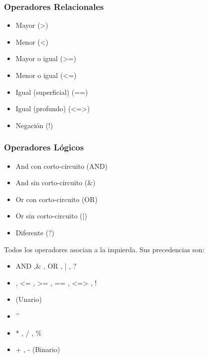 \documentclass[12pt, spanish]{report}
\begin{document}
\subsubsection{Operadores Relacionales}
\begin{itemize}
\item Mayor         (>)
\item Menor         (<)
\item Mayor o igual (>=)
\item Menor o igual (<=)
\item Igual (superficial) (==)
\item Igual (profundo)    (<=>)
\item Negaci\'on      (!)
\end{itemize}

\subsubsection{Operadores L\'ogicos}
\begin{itemize}
\item And con corto-circuito (AND)
\item And sin corto-circuito (\&)
\item Or con corto-circuito  (OR)
\item Or sin corto-circuito  (|)
\item Diferente              (?)
\end{itemize}

Todos los operadores asocian a la izquierda. Sus precedencias son:
\begin{itemize}
\item AND ,\& , OR , | , ?
\item < , > , <= , >= , == , <=> , !
\item \- (Unario)
\item \^
\item * , / , \%
\item + , - (Binario)
\end{itemize}
\end{document}
